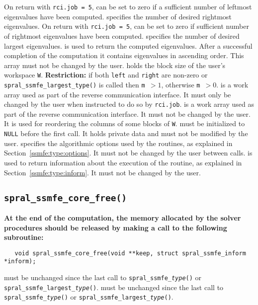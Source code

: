 \begin{description}
On return with {\tt rci.job = 5}, can be set to zero if a
sufficient number of leftmost eigenvalues have been computed.
%
 specifies the number of desired rightmost eigenvalues.
On return with {\tt rci.job = 5}, can be set to zero if
sufficient number of rightmost eigenvalues have been computed.
%
 specifies the number of desired largest eigenvalues.
%
 is
used to return the computed eigenvalues.
After a successful completion of the computation
it contains eigenvalues in ascending order.
This array must not be changed by the user.
%
holds the block size of the user's workspace {\tt W}. 
{\bf Restriction:} %
if both {\tt left} and {\tt right} are non-zero
or \texttt{spral\_ssmfe\_largest\_\texttt{type}()} is called then {\tt m $>1$},
otherwise {\tt m $>0$}.
%
 is a work array used as part of the reverse communication
interface.
It must only be changed by the user when
instructed to do so by 
{\tt rci.job}.
%
 is a work array used as part of the reverse communication
interface. 
It must not be changed by the user.
It is used for reordering the columns of some blocks of {\tt W}.
%
 must be initialized to \texttt{NULL} before the first call.
It holds private data and must not be modified by the user.
%
 specifies the algorithmic options used by the routines,
as explained in Section~\ref{ssmfe:type:options}.
It must not be changed by the user between calls.
%
 is used to return information about the execution of the
routine, as explained in Section~\ref{ssmfe:type:inform}.
It must not be changed by the user.
%
\end{description}

\subsection{\texttt{spral\_ssmfe\_core\_free()}}

{\bf
At the end of the computation, the memory 
allocated by the solver procedures
should be released
by making a call to the following subroutine:
}

\begin{verbatim}
   void spral_ssmfe_core_free(void **keep, struct spral_ssmfe_inform *inform);
\end{verbatim}

\begin{description}
%
 must be unchanged since the last call to
\texttt{spral\_ssmfe\_\textit{type}()} or
\texttt{spral\_ssmfe\_largest\_\textit{type}()}.
%
  must be unchanged since the last call to
\texttt{spral\_ssmfe\_\textit{type}()} or
\texttt{spral\_ssmfe\_largest\_\textit{type}()}.
%
\end{description}

